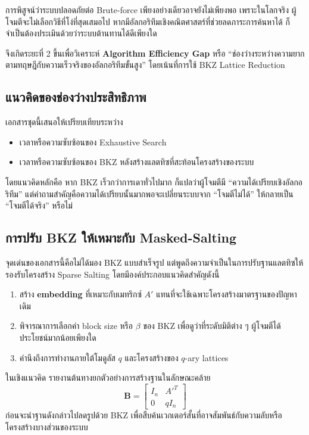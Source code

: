 \documentclass[12pt,a4paper]{article}
\newcommand{\term}[1]{\textbf{#1}}
\newcommand{\eng}[1]{\textenglish{#1}}
\newcommand{\mat}[1]{\mathbf{#1}}
\begin{document}
	การพิสูจน์ว่าระบบปลอดภัยต่อ \eng{Brute-force} เพียงอย่างเดียวอาจยังไม่เพียงพอ เพราะในโลกจริง ผู้โจมตีจะไม่เลือกวิธีที่โง่ที่สุดเสมอไป หากมีอัลกอริทึมเชิงคณิตศาสตร์ที่ช่วยลดภาระการค้นหาได้ ก็จำเป็นต้องประเมินด้วยว่าระบบต้านทานได้ดีเพียงใด
	
	จึงเกิดระยะที่ 2 ขึ้นเพื่อวิเคราะห์ \term{Algorithm Efficiency Gap} หรือ ``ช่องว่างระหว่างความยากตามทฤษฎีกับความเร็วจริงของอัลกอริทึมขั้นสูง'' โดยเน้นที่การใช้ \eng{BKZ Lattice Reduction}
	
	\subsection{แนวคิดของช่องว่างประสิทธิภาพ}
	
	เอกสารชุดนี้เสนอให้เปรียบเทียบระหว่าง
	\begin{itemize}
		\item เวลาหรือความซับซ้อนของ \eng{Exhaustive Search}
		\item เวลาหรือความซับซ้อนของ \eng{BKZ} หลังสร้างแลตทิซที่สะท้อนโครงสร้างของระบบ
	\end{itemize}
	
	โดยแนวคิดหลักคือ หาก \eng{BKZ} เร็วกว่าการเดาทั่วไปมาก ก็แปลว่าผู้โจมตีมี ``ความได้เปรียบเชิงอัลกอริทึม'' แต่คำถามสำคัญคือความได้เปรียบนั้นมากพอจะเปลี่ยนระบบจาก ``โจมตีไม่ได้'' ให้กลายเป็น ``โจมตีได้จริง'' หรือไม่
	
	\subsection{การปรับ \eng{BKZ} ให้เหมาะกับ \eng{Masked-Salting}}
	
	จุดเด่นของเอกสารนี้คือไม่ได้มอง \eng{BKZ} แบบสำเร็จรูป แต่พูดถึงความจำเป็นในการปรับฐานแลตทิซให้รองรับโครงสร้าง \eng{Sparse Salting} โดยมีองค์ประกอบแนวคิดสำคัญดังนี้
	\begin{enumerate}[label=\arabic*.]
		\item สร้าง \term{embedding} ที่เหมาะกับเมทริกซ์ $A'$ แทนที่จะใช้เฉพาะโครงสร้างมาตรฐานของปัญหาเดิม
		\item พิจารณาการเลือกค่า \eng{block size} หรือ $\beta$ ของ \eng{BKZ} เพื่อดูว่าที่ระดับมิติต่าง ๆ ผู้โจมตีได้ประโยชน์มากน้อยเพียงใด
		\item คำนึงถึงการทำงานภายใต้โมดูลัส $q$ และโครงสร้างของ \eng{$q$-ary lattices}
	\end{enumerate}
	
	ในเชิงแนวคิด รายงานต้นทางยกตัวอย่างการสร้างฐานในลักษณะคล้าย
	\[
	\mat{B} = \begin{bmatrix} I_n & A'^T \\ 0 & qI_n \end{bmatrix}
	\]
	ก่อนจะนำฐานดังกล่าวไปลดรูปด้วย \eng{BKZ} เพื่อสืบค้นเวกเตอร์สั้นที่อาจสัมพันธ์กับความลับหรือโครงสร้างบางส่วนของระบบ
	
\end{document}
